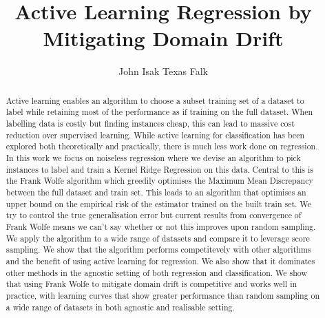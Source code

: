 
\title{Active Learning Regression by Mitigating Domain Drift}
\author{John Isak Texas Falk}

\maketitle
\makedeclaration

\begin{abstract} %
  Active learning enables an algorithm to choose a subset training set of a dataset to
  label while retaining most of the performance as if training on the full dataset.
  When labelling data is costly but finding instances cheap, this can lead to
  massive cost reduction over supervised learning.
  While active learning for classification has been explored both theoretically and practically, there
  is much less work done on regression.
  In this work we focus on noiseless regression where we devise an algorithm to
  pick instances to label and train a Kernel Ridge Regression on this data.
  Central to this is the Frank Wolfe algorithm which greedily optimises the Maximum Mean
  Discrepancy between the full dataset and train set. This leads to an algorithm
  that optimises an upper bound on the empirical risk of the estimator trained
  on the built train set. We try to control the true generalisation error but
  current results from convergence of Frank Wolfe means we can't say whether or
  not this improves upon random sampling.
  We apply the algorithm to a wide range of datasets and compare it to leverage
  score sampling. We show that the algorithm performs competitevely with other
  algorithms and the benefit of using active learning for regression. We also
  show that it dominates other methods in the agnostic setting of both
  regression and classification.
  We show that using Frank Wolfe to mitigate domain drift is competitive and
  works well in practice, with learning curves that show greater performance
  than random sampling on a wide range of datasets in both agnostic and
  realisable setting.
\end{abstract}


